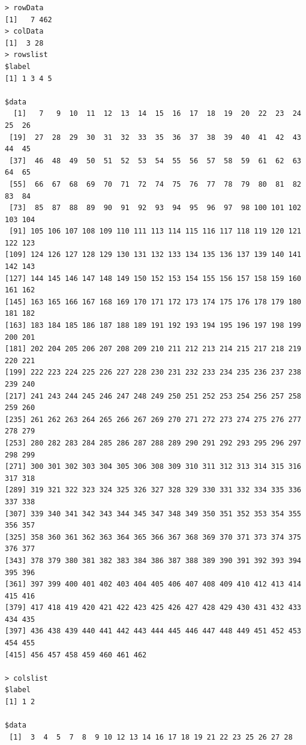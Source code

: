 \documentclass[a4paper]{article}
\begin{document}
\begin{verbatim}
> rowData 
[1]   7 462
> colData 
[1]  3 28
> rowslist 
$label
[1] 1 3 4 5

$data
  [1]   7   9  10  11  12  13  14  15  16  17  18  19  20  22  23  24  25  26
 [19]  27  28  29  30  31  32  33  35  36  37  38  39  40  41  42  43  44  45
 [37]  46  48  49  50  51  52  53  54  55  56  57  58  59  61  62  63  64  65
 [55]  66  67  68  69  70  71  72  74  75  76  77  78  79  80  81  82  83  84
 [73]  85  87  88  89  90  91  92  93  94  95  96  97  98 100 101 102 103 104
 [91] 105 106 107 108 109 110 111 113 114 115 116 117 118 119 120 121 122 123
[109] 124 126 127 128 129 130 131 132 133 134 135 136 137 139 140 141 142 143
[127] 144 145 146 147 148 149 150 152 153 154 155 156 157 158 159 160 161 162
[145] 163 165 166 167 168 169 170 171 172 173 174 175 176 178 179 180 181 182
[163] 183 184 185 186 187 188 189 191 192 193 194 195 196 197 198 199 200 201
[181] 202 204 205 206 207 208 209 210 211 212 213 214 215 217 218 219 220 221
[199] 222 223 224 225 226 227 228 230 231 232 233 234 235 236 237 238 239 240
[217] 241 243 244 245 246 247 248 249 250 251 252 253 254 256 257 258 259 260
[235] 261 262 263 264 265 266 267 269 270 271 272 273 274 275 276 277 278 279
[253] 280 282 283 284 285 286 287 288 289 290 291 292 293 295 296 297 298 299
[271] 300 301 302 303 304 305 306 308 309 310 311 312 313 314 315 316 317 318
[289] 319 321 322 323 324 325 326 327 328 329 330 331 332 334 335 336 337 338
[307] 339 340 341 342 343 344 345 347 348 349 350 351 352 353 354 355 356 357
[325] 358 360 361 362 363 364 365 366 367 368 369 370 371 373 374 375 376 377
[343] 378 379 380 381 382 383 384 386 387 388 389 390 391 392 393 394 395 396
[361] 397 399 400 401 402 403 404 405 406 407 408 409 410 412 413 414 415 416
[379] 417 418 419 420 421 422 423 425 426 427 428 429 430 431 432 433 434 435
[397] 436 438 439 440 441 442 443 444 445 446 447 448 449 451 452 453 454 455
[415] 456 457 458 459 460 461 462

> colslist 
$label
[1] 1 2

$data
 [1]  3  4  5  7  8  9 10 12 13 14 16 17 18 19 21 22 23 25 26 27 28


\end{verbatim}
\end{document}
